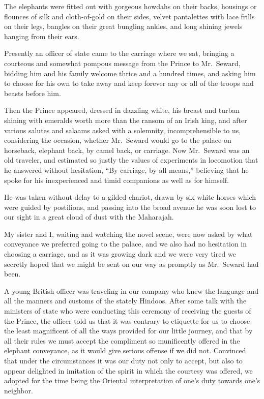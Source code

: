 \documentclass[12pt]{book}
\begin{document}
The elephants were fitted out with gorgeous howdahs on their backs, housings
or flounces of silk and cloth‐of‐gold on their sides, velvet pantalettes with lace
frills on their legs, bangles on their great bungling ankles, and long shining jewels
hanging from their ears.

Presently an officer of state came to the carriage where we sat, bringing
a courteous and somewhat pompous message from the Prince to Mr.~Seward,
bidding him and his family welcome thrice and a hundred times, and asking him
to choose for his own to take away and keep forever any or all of the troops and
beasts before him.

Then the Prince appeared, dressed in dazzling white, his breast and turban
shining with emeralds worth more than the ransom of an Irish king, and after
various salutes and salaams asked with a solemnity, incomprehensible to us, considering the occasion, whether Mr.~Seward would go to the palace on horseback,
elephant back, by camel back, or carriage. Now Mr.~Seward was an old traveler,
and estimated so justly the values of experiments in locomotion that he answered
without hesitation, “By carriage, by all means,” believing that he spoke for his
inexperienced and timid companions as well as for himself.

He was taken without delay to a gilded chariot, drawn by six white horses
which were guided by postilions, and passing into the broad avenue he was soon
lost to our sight in a great cloud of dust with the Maharajah.

My sister and I, waiting and watching the novel scene, were now asked by
what conveyance we preferred going to the palace, and we also had no hesitation
in choosing a carriage, and as it was growing dark and we were very tired we
secretly hoped that we might be sent on our way as promptly as Mr.~Seward had
been.

A young British officer was traveling in our company who knew the language
and all the manners and customs of the stately Hindoos. After some talk with the
ministers of state who were conducting this ceremony of receiving the guests of
the Prince, the officer told us that it was contrary to etiquette for us to choose the
least magnificent of all the ways provided for our little journey, and that by all
their rules we must accept the compliment so munificently offered in the elephant
conveyance, as it would give serious offense if we did not. Convinced that under
the circumstances it was our duty not only to accept, but also to appear delighted
in imitation of the spirit in which the courtesy was offered, we adopted for the
time being the Oriental interpretation of one’s duty towards one’s neighbor.
\end{document}
